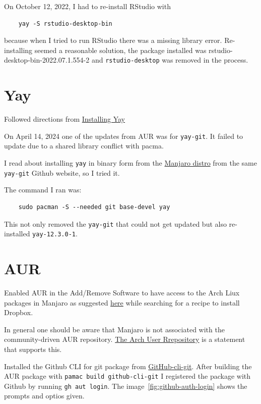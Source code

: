 \documentclass[]{scrartcl}
\begin{document}
On October 12, 2022, I had to re-install RStudio with
\begin{verbatim}
	yay -S rstudio-desktop-bin
\end{verbatim}

because when I tried to run RStudio there was a missing library error. 
Re-installing seemed a reasonable solution, the package installed was rstudio-desktop-bin-2022.07.1.554-2 and \texttt{rstudio-desktop} was removed in the process.

\section{Yay}
\label{sec:yay}

Followed directions from \href{https://www.tecmint.com/install-yay-aur-helper-in-arch-linux-and-manjaro/}{Installing Yay}


On April 14, 2024 one of the updates from AUR was for \texttt{yay-git}. It failed to update due to a shared library conflict with pacma. 

I read about installing \texttt{yay} in binary form from the \href{https://github.com/Jguer/yay?tab=readme-ov-file#other-distributions}{Manjaro distro} from the same \texttt{yay-git} Github website, so I tried it.

The command I ran was:

\begin{verbatim}
	sudo pacman -S --needed git base-devel yay
\end{verbatim}

This not only removed the \texttt{yay-git} that could not get updated but also re-installed \texttt{yay-12.3.0-1}.


\section{AUR}

Enabled AUR in the Add/Remove Software to have access to the Arch Liux packages in Manjaro as suggested \href{https://forum.manjaro.org/t/dropbox-install-new-to-manjaro/9576/5}{here} while searching for a recipe to install Dropbox.


In general one should be aware that Manjaro is not associated with the community-driven AUR repository.
\href{https://wiki.manjaro.org/index.php?title=Arch_User_Repository}{The Arch User Rrepository} is a statement that supports this.

Installed the Github CLI for git package from \href{https://aur.archlinux.org/packages/github-cli-git}{GitHub-cli-git}.
After building the AUR package with \texttt{pamac build github-cli-git} I registered the package with Github by running \texttt{gh aut login}. The image~\ref{fig:github-auth-login} shows the prompts and optios given.
\end{document}
